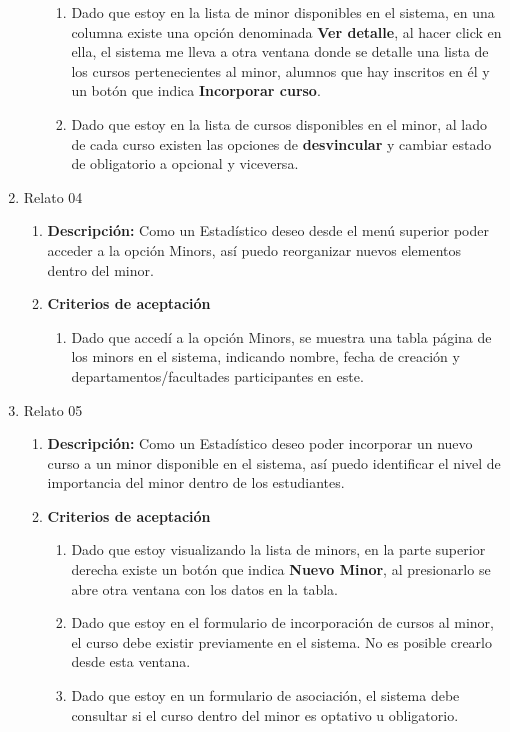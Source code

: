 \begin{enumerate}
\begin{enumerate}
\begin{enumerate}
					\item Dado que estoy en la lista de minor disponibles en el sistema, en una columna existe una opción denominada \textbf{Ver detalle}, al hacer click en ella, el sistema me lleva a otra ventana donde se detalle una lista de los cursos pertenecientes al minor, alumnos que hay inscritos en él y un botón que indica \textbf{Incorporar curso}.
					\item Dado que estoy en la lista de cursos disponibles en el minor, al lado de cada curso existen las opciones de \textbf{desvincular} y cambiar estado de obligatorio a opcional y viceversa.
				\end{enumerate}
		\end{enumerate}
	\item Relato 04
		\begin{enumerate}
			\item \textbf{Descripción:} Como un Estadístico deseo desde el menú superior poder acceder a la opción Minors, así puedo reorganizar nuevos elementos dentro del minor.
			\item \textbf{Criterios de aceptación}
				\begin{enumerate}
					\item Dado que accedí a la opción Minors, se muestra una tabla página de los minors en el sistema, indicando nombre, fecha de creación y departamentos/facultades participantes en este.
				\end{enumerate}
		\end{enumerate}
	\item Relato 05
		\begin{enumerate}
			\item \textbf{Descripción:} Como un Estadístico deseo poder incorporar un nuevo curso a un minor disponible en el sistema, así puedo identificar el nivel de importancia del minor dentro de los estudiantes.
			\item \textbf{Criterios de aceptación}
				\begin{enumerate}
					\item Dado que estoy visualizando la lista de minors, en la parte superior derecha existe un botón que indica \textbf{Nuevo Minor}, al presionarlo se abre otra ventana con los datos en la tabla.
					\item Dado que estoy en el formulario de incorporación de cursos al minor, el curso debe existir previamente en el sistema. No es posible crearlo desde esta ventana.
					\item Dado que estoy en un formulario de asociación, el sistema debe consultar si el curso dentro del minor es optativo u obligatorio.

\end{enumerate}
\end{enumerate}
\end{enumerate}

